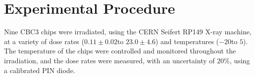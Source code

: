\section{Experimental Procedure}
\label{sec:ExpProc}
Nine CBC3 chips were irradiated, using the CERN Seifert RP149 X-ray machine, at a variety of dose rates (${0.11\pm0.02}$\kGyH to ${23.0\pm4.6}$\kGyH) and temperatures (${-20}$\deg to ${5}$\deg). The temperature of the chips were controlled and monitored throughout the irradiation, and the dose rates were measured, with an uncertainty of ${20}$\%, using a calibrated PIN diode. 
